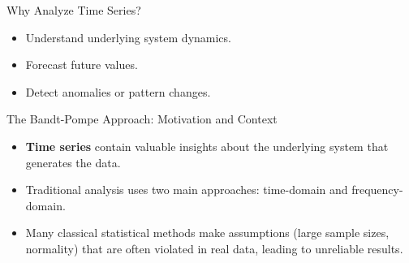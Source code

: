 \documentclass{beamer}
\begin{document}
\begin{frame}{Why Analyze Time Series?}
	\begin{itemize}
		\item Understand underlying system dynamics.
		\item Forecast future values.
		\item Detect anomalies or pattern changes. %
	\end{itemize}
\end{frame}



\begin{frame}{The Bandt-Pompe Approach: Motivation and Context}
	\begin{itemize}
		\item \textbf{Time series} contain valuable insights about the underlying system that generates the data.
		\item Traditional analysis uses two main approaches: time-domain and frequency-domain.
		\item Many classical statistical methods make assumptions (large sample sizes, normality) that are often violated in real data, leading to unreliable results.
	\end{itemize}
\end{frame}
\end{document}
